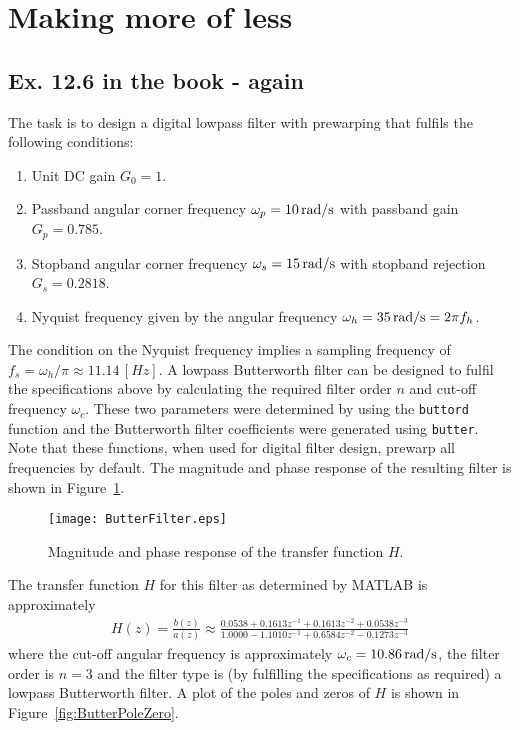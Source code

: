 
\section{\large Making more of less}

\subsection{Ex. 12.6 in the book - again}
The task is to design a digital lowpass filter with prewarping that fulfils the following conditions:
\begin{enumerate}
  \item Unit DC gain $G_0 =1$.
  \item Passband angular corner frequency $\omega_p = 10 \, \textnormal{rad/s}$ with passband gain $G_p = 0.785$.
  \item Stopband angular corner frequency $\omega_s = 15 \, \textnormal{rad/s}$ with stopband rejection $G_s = 0.2818$.
  \item Nyquist frequency given by the angular frequency $\omega_h = 35 \, \textnormal{rad/s} =2\pi f_h$.
\end{enumerate}
The condition on the Nyquist frequency implies a sampling frequency of $f_s = \omega_h/\pi \approx 11.14\, [Hz]$. A lowpass Butterworth filter can be designed to fulfil the specifications above by calculating the required filter order $n$ and cut-off frequency $\omega_c$. These two parameters were determined by using the \texttt{buttord} function and the Butterworth filter coefficients were generated using \texttt{butter}. Note that these functions, when used for digital filter design, prewarp all frequencies by default. The magnitude and phase response of the resulting filter is shown in Figure~\ref{fig:ButterFilter}.

\begin{figure}
\center
\texttt{[image: ButterFilter.eps]}
\caption{Magnitude and phase response of the transfer function $H$.}
\label{fig:ButterFilter}
\end{figure}

\noindent The transfer function $H$ for this filter as determined by MATLAB is approximately
\begin{align*}
H(z) = \frac{b(z)}{a(z)} \approx \frac{0.0538 + 0.1613 z^{-1} + 0.1613 z^{-2} +	0.0538 z^{-3}}{1.0000 - 1.1010z^{-1} +0.6584z^{-2} -0.1273z^{-3}}
\end{align*}
where the cut-off angular frequency is approximately $\omega_c = 10.86 \, \textnormal{rad/s}$, the filter order is $n=3$
and the filter type is (by fulfilling the specifications as required) a lowpass Butterworth filter. A plot of the poles and zeros of $H$ is shown in Figure~\ref{fig:ButterPoleZero}.

